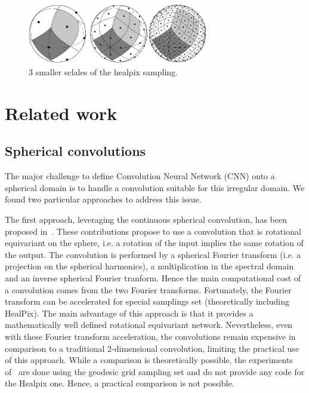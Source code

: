 \documentclass[final,twocolumn,3p,times,authoryear]{elsarticle}
\newcommand{\1}{\b{1}}              %
\newcommand{\0}{\b{0}}              %
\begin{document}
\begin{figure}[!ht]
\centering
\includegraphics[width=0.7\textwidth]{figures/healpix-3layers.jpg}
\caption{3 smaller sclales of the healpix sampling.}
\label{fig:healpix_sampling}
\end{figure}

\section{Related work}
\label{sec:related}



\subsection{Spherical convolutions} 
The major challenge to define Convolution Neural Network (CNN) onto a
spherical domain is to handle a convolution suitable for this irregular domain. 
We found two particular approaches to address this issue.

The first approach, leveraging the continuous spherical convolution, has been
proposed in~\cite{cohen2017convolutional,cohen2018spherical}. These
contributions propose to use a convolution that is rotational equivariant on the
sphere, i.e. a rotation of the input implies the same rotation of the output.
The convolution is performed by a spherical Fourier transform (i.e. a projection
on the spherical harmonics), a  multiplication in the spectral domain and an
inverse spherical Fourier tranform. Hence the main computational cost of a
convolution comes from the two Fourier transforms. Fortunately, the Fourier
transform can be accelerated for special samplings set (theoretically including
HealPix). The main advantage of this approach is that it provides a
mathematically well defined rotational equivariant network. Nevertheless, even
with these Fourier transform acceleration, the convolutions remain expensive in
comparison to a traditional 2-dimensional convolution, limiting the practical use of this
approach. While a comparison is theoretically possible, the experiments
of~\cite{cohen2018spherical} are done using the geodesic grid sampling set and
do not provide any code for the Healpix one. Hence, a practical comparison is
not possible.
\end{document}
